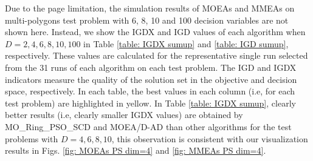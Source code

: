 \documentclass[conference]{IEEEtran}
\begin{document}
Due to the page limitation, the simulation results of MOEAs and MMEAs on multi-polygons test problem with 6, 8, 10 and 100 decision variables are not shown here. Instead, we show the IGDX\cite{liang2016multimodal} and IGD values of each algorithm when $D=2, 4, 6, 8, 10, 100$ in Table \ref{table: IGDX sumup} and \ref{table: IGD sumup}, respectively. These values are calculated for the representative single run selected from the 31 runs of each algorithm on each test problem. The IGD and IGDX indicators measure the quality of the solution set in the objective and decision space, respectively. In each table, the best values in each column (i.e, for each test problem) are highlighted in yellow. In Table \ref{table: IGDX sumup}, clearly better results (i.e, clearly smaller IGDX values) are obtained by MO\_Ring\_PSO\_SCD and MOEA/D-AD than other algorithms for the test problems with $D = 4, 6, 8, 10$, this observation is consistent with our visualization results in Figs. \ref{fig: MOEAs PS dim=4} and \ref{fig: MMEAs PS dim=4}.
\end{document}
